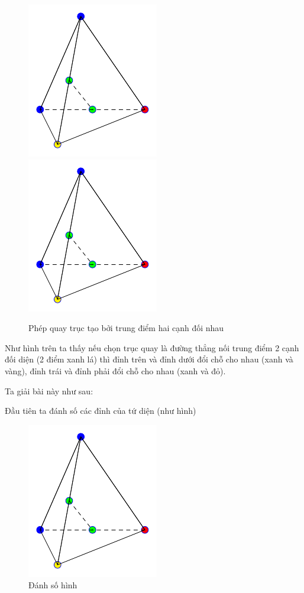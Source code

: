 \begin{figure}[ht]
    \centering
    \includegraphics[page=1]{figures/tetrahedron.pdf}
    \includegraphics[page=2]{figures/tetrahedron.pdf}
    \caption{Phép quay trục tạo bởi trung điểm hai cạnh đối nhau}
\end{figure}

Như hình trên ta thấy nếu chọn trục quay là đường thẳng nối trung điểm 2 cạnh đối diện (2 điểm xanh lá) thì đỉnh trên và đỉnh dưới đổi chỗ cho nhau (xanh và vàng), đỉnh trái và đỉnh phải đổi chỗ cho nhau (xanh và đỏ).

Ta giải bài này như sau:

Đầu tiên ta đánh số các đỉnh của tứ diện (như hình)

\begin{figure}[htb]
    \centering
    \includegraphics[page=3]{figures/tetrahedron.pdf}
    \caption{Đánh số hình}
\end{figure}

